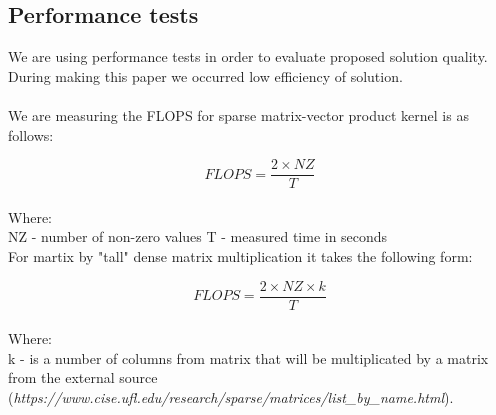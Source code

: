 \documentclass{scrreprt}
\begin{document}
\subsection{Performance tests}
We are using performance tests in order to evaluate proposed solution quality. During making this paper we occurred low efficiency of solution.  \\
\\
We are measuring the FLOPS for sparse matrix-vector product kernel is as follows:

\begin{equation}
FLOPS = \dfrac{2 \times NZ}{T}
\end{equation}
\\
Where:
\\
NZ - number of non-zero values
T - measured time in seconds
\\
For martix by "tall" dense matrix multiplication it takes the following form:

\begin{equation}
FLOPS = \dfrac{2 \times NZ \times k}{T}
\end{equation}
\\
Where:
\\
k - is a number of columns  from matrix that will be multiplicated by a matrix from the external source (\textit{https://www.cise.ufl.edu/research/sparse/matrices/list_by_name.html}).
\end{document}
